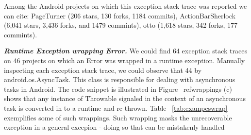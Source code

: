 \documentclass[conference]{IEEEtran}
\begin{document}
Among the Android projects on which this exception stack trace was reported we can cite:
PageTurner (206 stars, 130 forks, 1184 commits), ActionBarSherlock (6,041 stars, 
3,436 forks, and 1479 commints), otto (1,618 stars,	342 forks, 	177 commints).

\noindent {}

\emph{\textbf{Runtime Exception wrapping Error.}} We could find  64 exception stack traces 
on 46 projects on which an Error was wrapped in a runtime exception.
Manually inspecting each exception stack trace, we could observe that 44%
by android.os.AsyncTask. This class is responsible for dealing with asynchronous tasks in Android.
The code snippet is illustrated in Figure ~ref{wrappings} (c) shows that any instance of Throwable signaled in the context of an asynchronous 
task is converted in to a runtime and re-thrown.  Table ~\ref{tab:exampeswrap} exemplifies some of such wrappings.
Such wrapping masks the unrecoverable exception in a general excepion - doing so  that can be mistakenly handled
\end{document}
